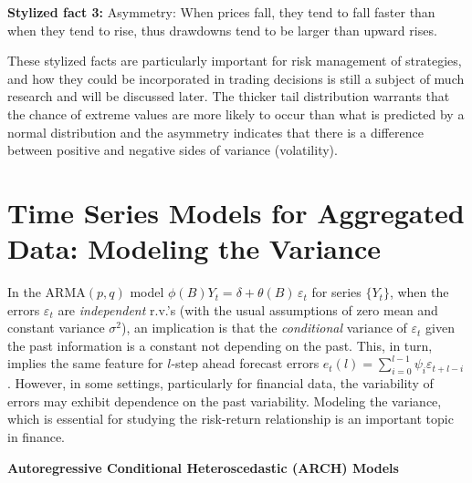 \noindent\textbf{Stylized fact 3:} Asymmetry: When prices fall, they tend to fall faster
than when they tend to rise, thus drawdowns tend to be larger than upward rises. \twomedskip


These stylized facts are particularly important for risk management of strategies, and how they could be incorporated in trading decisions is still a subject of much research and will be discussed later. The thicker tail distribution warrants that the chance of extreme values are more likely to occur than what is predicted by a normal distribution and the asymmetry indicates that there is a difference between positive and negative sides of variance (volatility). 



\section{Time Series Models for Aggregated Data: Modeling the Variance}


In the ARMA$(p,q)$ model $\phi(B)Y_t= \delta + \theta(B) \,\varepsilon_t$ for series $\{ Y_t \}$, when the errors $\varepsilon_t$ are \emph{independent} r.v.'s (with the usual assumptions of zero mean and constant variance $\sigma^2$), an implication is that the \textit{conditional} variance of $\varepsilon_t$ given the past information is a constant not depending on the past. This, in turn, implies the same feature for $l$-step ahead forecast errors $e_t(l) = \sum_{i=0}^{l-1} \psi_i \varepsilon_{t+l-i}$. However, in some settings, particularly for financial data, the variability of errors may exhibit dependence on the past variability. Modeling the variance, which is essential for studying the risk-return relationship is an important topic in finance. \twomedskip


\noindent \textbf{Autoregressive Conditional Heteroscedastic (ARCH) Models} \twomedskip


